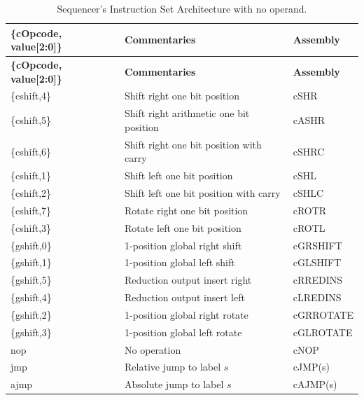 {\small
{\centering
\begin{longtable}{|l|l|l|}
\caption{Sequencer's Instruction Set Architecture with no operand.}
\label{tab:sequencer_isa} \\
\hline
\textbf{\{cOpcode, value[2:0]\}} & \textbf{Commentaries}                         & \textbf{Assembly}    \\
\hline
\endfirsthead
\hline
\textbf{\{cOpcode, value[2:0]\}} & \textbf{Commentaries}                         & \textbf{Assembly}    \\
\hline
\endhead
\hline
\endfoot
\hline
\endlastfoot
\{cshift,4\}   & Shift right one bit position                  & cSHR         \\ \hline
\{cshift,5\}   & Shift right arithmetic one bit position       & cASHR        \\ \hline
\{cshift,6\}   & Shift right one bit position with carry       & cSHRC        \\ \hline
\{cshift,1\}   & Shift left one bit position                   & cSHL         \\ \hline
\{cshift,2\}   & Shift left one bit position with carry        & cSHLC        \\ \hline
\{cshift,7\}   & Rotate right one bit position                 & cROTR        \\ \hline
\{cshift,3\}   & Rotate left one bit position                  & cROTL        \\ \hline
\{gshift,0\}   & 1-position global right shift                 & cGRSHIFT     \\ \hline
\{gshift,1\}   & 1-position global left shift                  & cGLSHIFT     \\ \hline
\{gshift,5\}   & Reduction output insert right                 & cRREDINS     \\ \hline
\{gshift,4\}   & Reduction output insert left                  & cLREDINS     \\ \hline
\{gshift,2\}   & 1-position global right rotate                & cGRROTATE    \\ \hline
\{gshift,3\}   & 1-position global left rotate                 & cGLROTATE    \\ \hline
nop            & No operation                                  & cNOP         \\ \hline
jmp            & Relative jump to label \(s\)                 & cJMP(s)      \\ \hline
ajmp           & Absolute jump to label \(s\)                 & cAJMP(s)     \\ \hline

\end{longtable}}}
